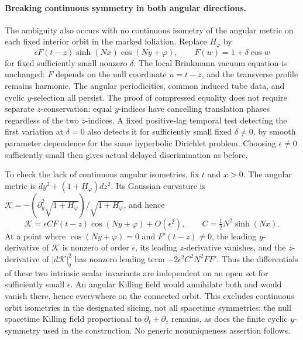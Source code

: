 \documentclass[11pt]{article}
\begin{document}
\paragraph{Breaking continuous symmetry in both angular directions.}
The ambiguity also occurs with no continuous isometry of the angular metric on each fixed interior orbit in the marked foliation. Replace \(H_\varphi\) by
\[
 \epsilon F(t-z)\sinh(Nx)\cos(Ny+\varphi),
 \qquad F(w)=1+\delta\cos w
\]
for fixed sufficiently small nonzero \(\delta\). The local Brinkmann vacuum equation is unchanged: \(F\) depends on the null coordinate \(u=t-z\), and the transverse profile remains harmonic. The angular periodicities, common induced tube data, and cyclic \(y\)-selection all persist. The proof of compressed equality does not require separate \(z\)-conservation: equal \(y\)-indices have cancelling translation phases regardless of the two \(z\)-indices. A fixed positive-lag temporal test detecting the first variation at \(\delta=0\) also detects it for sufficiently small fixed \(\delta\ne0\), by smooth parameter dependence for the same hyperbolic Dirichlet problem. Choosing \(\epsilon\ne0\) sufficiently small then gives actual delayed discrimination as before.

To check the lack of continuous angular isometries, fix \(t\) and \(x>0\). The angular metric is \(dy^2+(1+H_\varphi)dz^2\). Its Gaussian curvature is \(\mathcal K=-(\partial_y^2\sqrt{1+H_\varphi})/\sqrt{1+H_\varphi}\), and hence
\[
 \mathcal K=\epsilon C F(t-z)\cos(Ny+\varphi)+O(\epsilon^2),
 \qquad C=\tfrac12N^2\sinh(Nx).
\]
At a point where \(\cos(Ny+\varphi)=0\) and \(F'(t-z)\ne0\), the leading \(y\)-derivative of \(\mathcal K\) is nonzero of order \(\epsilon\), its leading \(z\)-derivative vanishes, and the \(z\)-derivative of \(|d\mathcal K|_q^2\) has nonzero leading term \(-2\epsilon^2 C^2N^2 F F'\). Thus the differentials of these two intrinsic scalar invariants are independent on an open set for sufficiently small \(\epsilon\). An angular Killing field would annihilate both and would vanish there, hence everywhere on the connected orbit. This excludes continuous orbit isometries in the designated slicing, not all spacetime symmetries: the null spacetime Killing field proportional to \(\partial_t+\partial_z\) remains, as does the finite cyclic \(y\)-symmetry used in the construction. No generic nonuniqueness assertion follows.
\end{document}
